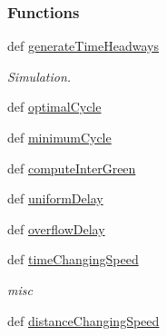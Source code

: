 \subsubsection*{Functions}
\begin{DoxyCompactItemize}
\item 
def \hyperlink{namespacetraffic__engineering_a406ac852792f5578e3b6cc8fc39b9543}{generate\-Time\-Headways}
\begin{DoxyCompactList}\small\item\em Simulation. \end{DoxyCompactList}\item 
def \hyperlink{namespacetraffic__engineering_a6f759627100bbb75d2c52c57eda845d9}{optimal\-Cycle}
\item 
def \hyperlink{namespacetraffic__engineering_a9135a8c76b727b2dd20301191404142b}{minimum\-Cycle}
\item 
def \hyperlink{namespacetraffic__engineering_ac9ec308865dfe7ec391f4b5842fb7ff9}{compute\-Inter\-Green}
\item 
def \hyperlink{namespacetraffic__engineering_a7212f918637a7c51b70cc847d175a03c}{uniform\-Delay}
\item 
def \hyperlink{namespacetraffic__engineering_a6d697ddbe80a14e332ff3566ba4b5f82}{overflow\-Delay}
\item 
def \hyperlink{namespacetraffic__engineering_aabed53c189ccbc05b1f82afe6988edbf}{time\-Changing\-Speed}
\begin{DoxyCompactList}\small\item\em misc \end{DoxyCompactList}\item 
def \hyperlink{namespacetraffic__engineering_aeb617a74ff35b356b24d5218584613fa}{distance\-Changing\-Speed}
\end{DoxyCompactItemize}


